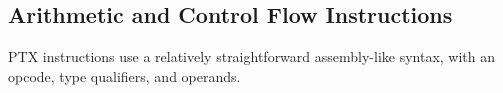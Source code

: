 \subsection{Arithmetic and Control Flow Instructions}

PTX instructions use a relatively straightforward assembly-like syntax, with an opcode, type qualifiers, and operands.

